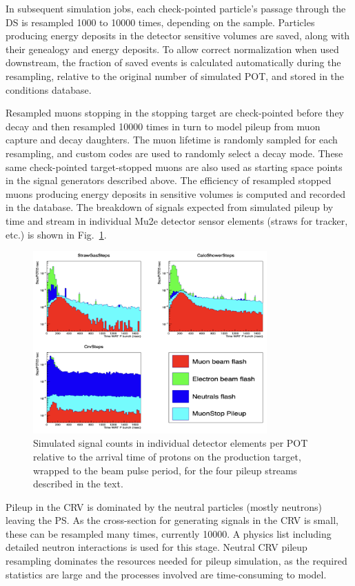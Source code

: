 In subsequent simulation jobs, each check-pointed particle's passage through the DS is resampled 1000 to 10000 times, depending on the sample. Particles producing energy deposits in the detector sensitive volumes are saved, along with their genealogy and energy deposits. To allow correct normalization when used downstream, the fraction of saved events is calculated automatically during the resampling, relative to the original number of simulated POT, and stored in the conditions database.

Resampled muons stopping in the stopping target are check-pointed before they decay and then resampled 10000 times in turn to model pileup from muon capture and decay daughters. The muon lifetime is randomly sampled for each resampling, and custom codes are used to randomly select a decay mode. These same check-pointed target-stopped muons are also used as starting space points in the signal generators described above. The efficiency of resampled stopped muons producing energy deposits in sensitive volumes is computed and recorded in the database. 
The breakdown of signals expected from simulated pileup by time and stream in individual Mu2e detector sensor elements (straws for tracker, etc.) is shown in Fig.~\ref{fig:sim_pileup}.

\begin{figure}[ht!]
\centering
\includegraphics[width=0.8\textwidth]{figures/sim_pileup.png}%
\caption{Simulated signal counts in individual detector elements per POT relative to the arrival time of protons on the production target, wrapped to the beam pulse period, for the four pileup streams described in the text.}
\label{fig:sim_pileup}
\end{figure}

Pileup in the CRV is dominated by the neutral particles (mostly neutrons) leaving the PS. As the cross-section for generating signals in the CRV is small, these can be resampled many times, currently 10000. A physics list including detailed neutron interactions is used for this stage. Neutral CRV pileup resampling dominates the resources needed for pileup simulation, as the required statistics are large and the processes involved are time-consuming to model.

